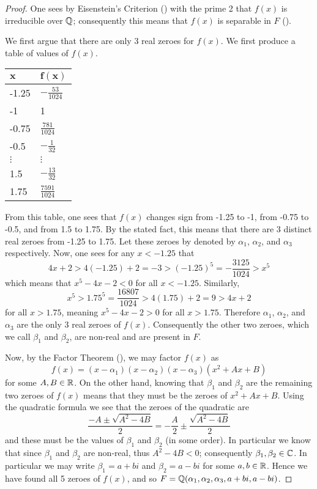 \begin{proof}
    One sees by Eisenstein's Criterion () with the prime 2 that $f(x)$ is irreducible over $\mathbb{Q}$; consequently this means that $f(x)$ is separable in $F$ ().

    We first argue that there are only 3 real zeroes for $f(x)$. We first produce a table of values of $f(x)$.
    \begin{table}[H]
        \centering
        \begin{tabular}{|l|l|}
            \hline
            $\boldsymbol{x}$ & $\boldsymbol{f(x)}$ \\ \hline
            -1.25 & $-\frac{53}{1024}$ \\ \hline
            -1 & 1 \\ \hline
            -0.75 & $\frac{781}{1024}$ \\ \hline
            -0.5 & $-\frac1{32}$ \\ \hline
            $\vdots$ & $\vdots$ \\ \hline
            1.5 & $-\frac{13}{32}$ \\ \hline
            1.75 & $\frac{7591}{1024}$ \\ \hline
        \end{tabular}
    \end{table}
    From this table, one sees that $f(x)$ changes sign from -1.25 to -1, from -0.75 to -0.5, and from 1.5 to 1.75. By the stated fact, this means that there are 3 distinct real zeroes from -1.25 to 1.75. Let these zeroes by denoted by $\alpha_1$, $\alpha_2$, and $\alpha_3$ respectively. Now, one sees for any $x < -1.25$ that
    \[
        4x + 2 > 4(-1.25) + 2 = -3 > (-1.25)^5 = -\frac{3125}{1024} > x^5
    \]
    which means that $x^5 - 4x - 2 < 0$ for all $x < -1.25$. Similarly,
    \[
        x^5 > 1.75^5 = \frac{16807}{1024} > 4(1.75) + 2 = 9 > 4x + 2
    \]
    for all $x > 1.75$, meaning $x^5 - 4x - 2 > 0$ for all $x > 1.75$. Therefore $\alpha_1$, $\alpha_2$, and $\alpha_3$ are the only 3 real zeroes of $f(x)$. Consequently the other two zeroes, which we call $\beta_1$ and $\beta_2$, are non-real and are present in $F$.

    Now, by the Factor Theorem (), we may factor $f(x)$ as
    \[
        f(x) = (x-\alpha_1)(x-\alpha_2)(x-\alpha_3)(x^2 + Ax + B)
    \]
    for some $A, B \in \mathbb{R}$. On the other hand, knowing that $\beta_1$ and $\beta_2$ are the remaining two zeroes of $f(x)$ means that they must be the zeroes of $x^2 + Ax + B$. Using the quadratic formula we see that the zeroes of the quadratic are
    \[
        \frac{-A\pm\sqrt{A^2 - 4B}}{2} = -\frac{A}{2} \pm \frac{\sqrt{A^2-4B}}2
    \]
    and these must be the values of $\beta_1$ and $\beta_2$ (in some order). In particular we know that since $\beta_1$ and $\beta_2$ are non-real, thus $A^2 - 4B < 0$; consequently $\beta_1, \beta_2 \in \mathbb{C}$. In particular we may write $\beta_1 = a + bi$ and $\beta_2 = a-bi$ for some $a, b \in \mathbb{R}$. Hence we have found all 5 zeroes of $f(x)$, and so $F = \mathbb{Q}(\alpha_1, \alpha_2, \alpha_3, a+bi, a-bi)$.


\end{proof}
